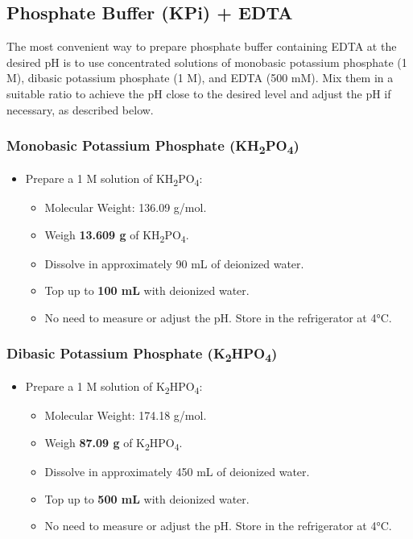 \documentclass[
  9pt,
  american,
  a5paper,
  extrafontsizes,onecolumn,openright
  ]{memoir}
\providecommand{\tightlist}{%
  \setlength{\itemsep}{0pt}\setlength{\parskip}{0pt}}
\begin{document}
\subsection{Phosphate Buffer (KPi) + EDTA}\label{phosphate-buffer-kpi-edta}

The most convenient way to prepare phosphate buffer containing EDTA at the desired pH is to use concentrated solutions of monobasic potassium phosphate (1 M), dibasic potassium phosphate (1 M), and EDTA (500 mM). Mix them in a suitable ratio to achieve the pH close to the desired level and adjust the pH if necessary, as described below.

\subsubsection{\texorpdfstring{Monobasic Potassium Phosphate (KH\textsubscript{2}PO\textsubscript{4})}{Monobasic Potassium Phosphate (KH2PO4)}}\label{monobasic-potassium-phosphate-kh2po4}

\begin{itemize}
\tightlist
\item
  Prepare a 1 M solution of KH\textsubscript{2}PO\textsubscript{4}:

  \begin{itemize}
  \tightlist
  \item
    Molecular Weight: 136.09 g/mol.
  \item
    Weigh \textbf{13.609 g} of KH\textsubscript{2}PO\textsubscript{4}.
  \item
    Dissolve in approximately 90 mL of deionized water.
  \item
    Top up to \textbf{100 mL} with deionized water.
  \item
    No need to measure or adjust the pH. Store in the refrigerator at 4°C.
  \end{itemize}
\end{itemize}

\subsubsection{\texorpdfstring{Dibasic Potassium Phosphate (K\textsubscript{2}HPO\textsubscript{4})}{Dibasic Potassium Phosphate (K2HPO4)}}\label{dibasic-potassium-phosphate-k2hpo4}

\begin{itemize}
\tightlist
\item
  Prepare a 1 M solution of K\textsubscript{2}HPO\textsubscript{4}:

  \begin{itemize}
  \tightlist
  \item
    Molecular Weight: 174.18 g/mol.
  \item
    Weigh \textbf{87.09 g} of K\textsubscript{2}HPO\textsubscript{4}.
  \item
    Dissolve in approximately 450 mL of deionized water.
  \item
    Top up to \textbf{500 mL} with deionized water.
  \item
    No need to measure or adjust the pH. Store in the refrigerator at 4°C.
  \end{itemize}
\end{itemize}
\end{document}
